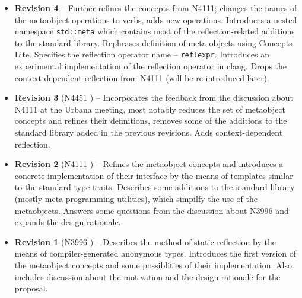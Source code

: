 \begin{itemize}
\item{\textbf{Revision 4}} -- Further refines the concepts from N4111; changes
the names of the metaobject operations to verbs, adds new operations. Introduces a nested namespace
\texttt{std::meta} which contains most of the reflection-related additions to the standard library.
Rephrases definition of meta objects using Concepts Lite. Specifies the
reflection operator name -- \texttt{reflexpr}.
Introduces an experimental implementation of the reflection operator in clang.
Drops the context-dependent reflection from N4111 (will be re-introduced later).

\item{\textbf{Revision 3} (N4451 \cite{n4451})} -- Incorporates the feedback from the discussion
about N4111 at the Urbana meeting, most notably reduces the set of metaobject concepts and refines their
definitions, removes some of the additions to the standard library added in the previous revisions.
Adds context-dependent reflection.

\item{\textbf{Revision 2} (N4111 \cite{n4111})} -- Refines the metaobject concepts and introduces
a concrete implementation of their interface by the means of templates similar
to the standard type traits. Describes some additions to the standard library
(mostly meta-programming utilities), which simpilfy the use of the metaobjects.
Answers some questions from the discussion about N3996 and expands the design
rationale.

\item{\textbf{Revision 1} (N3996 \cite{n3996})} -- Describes the method of static reflection
by the means of compiler-generated anonymous types. Introduces the first version
of the metaobject concepts and some possiblities of their implementation.
Also includes discussion about the motivation and the design rationale for the proposal.
\end{itemize}
